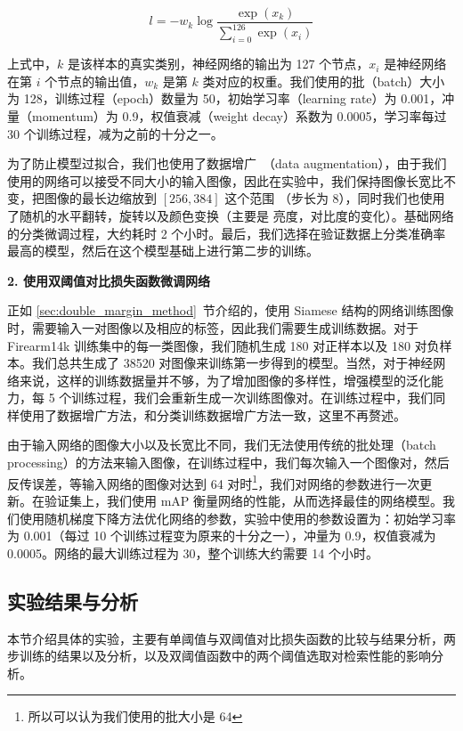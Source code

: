 \begin{equation}
l = -w_k \log\frac{\exp(x_k)}{\sum_{i=0}^{126} \exp(x_i)}
\end{equation}

\noindent 上式中，$k$ 是该样本的真实类别，神经网络的输出为 127 个节点，$x_i$ 是神经网络在第 $i$ 个节点的输出值，$w_k$ 是第 $k$ 类对应的权重。我们使用的批（batch）大小为 128，训练过程（epoch）数量为 50，初始学习率（learning rate）为 0.001，冲量（momentum）为 0.9，权值衰减（weight decay）系数为 0.0005，学习率每过 30 个训练过程，减为之前的十分之一。

为了防止模型过拟合，我们也使用了数据增广~\cite{Krizhevsky2012ImageNetCW}（data augmentation），由于我们使用的网络可以接受不同大小的输入图像，因此在实验中，我们保持图像长宽比不变，把图像的最长边缩放到 $[256, 384]$ 这个范围 （步长为 8），同时我们也使用了随机的水平翻转，旋转以及颜色变换（主要是 亮度，对比度的变化）。基础网络的分类微调过程，大约耗时 2 个小时。最后，我们选择在验证数据上分类准确率最高的模型，然后在这个模型基础上进行第二步的训练。

\noindent \textbf{2. 使用双阈值对比损失函数微调网络}

正如 \ref{sec:double_margin_method}~节介绍的，使用 Siamese 结构的网络训练图像时，需要输入一对图像以及相应的标签，因此我们需要生成训练数据。对于 Firearm14k 训练集中的每一类图像，我们随机生成 180 对正样本以及 180 对负样本。我们总共生成了 38520 对图像来训练第一步得到的模型。当然，对于神经网络来说，这样的训练数据量并不够，为了增加图像的多样性，增强模型的泛化能力，每 5 个训练过程，我们会重新生成一次训练图像对。在训练过程中，我们同样使用了数据增广方法，和分类训练数据增广方法一致，这里不再赘述。

由于输入网络的图像大小以及长宽比不同，我们无法使用传统的批处理（batch processing）的方法来输入图像，在训练过程中，我们每次输入一个图像对，然后反传误差，等输入网络的图像对达到 64 对时\footnote{所以可以认为我们使用的批大小是 64}，我们对网络的参数进行一次更新。在验证集上，我们使用 mAP 衡量网络的性能，从而选择最佳的网络模型。我们使用随机梯度下降方法优化网络的参数，实验中使用的参数设置为：初始学习率为 0.001（每过 10 个训练过程变为原来的十分之一），冲量为 0.9，权值衰减为 0.0005。网络的最大训练过程为 30，整个训练大约需要 14 个小时。

\subsection{实验结果与分析}\label{subsec:double_margin_result_analysis}

本节介绍具体的实验，主要有单阈值与双阈值对比损失函数的比较与结果分析，两步训练的结果以及分析，以及双阈值函数中的两个阈值选取对检索性能的影响分析。

